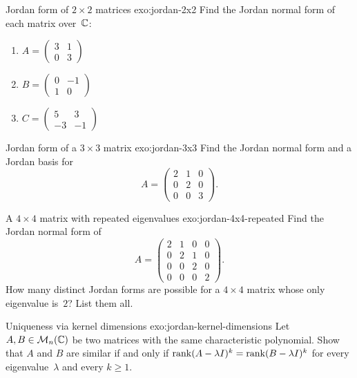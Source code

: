 \begin{exercise}{Jordan form of $2 \times 2$ matrices \basic}%
{exo:jordan-2x2}
Find the Jordan normal form of each matrix over~${\mathbb{C}}$:
\begin{enumerate}[label=(\alph*)]
  \item $A = \begin{pmatrix} 3 & 1 \\ 0 & 3 \end{pmatrix}$
  \item $B = \begin{pmatrix} 0 & -1 \\ 1 & 0 \end{pmatrix}$
  \item $C = \begin{pmatrix} 5 & 3 \\ -3 & -1 \end{pmatrix}$
\end{enumerate}
\end{exercise}

\begin{exercise}{Jordan form of a $3 \times 3$ matrix \intermediate}%
{exo:jordan-3x3}
Find the Jordan normal form and a Jordan basis for
\[
  A = \begin{pmatrix} 2 & 1 & 0 \\ 0 & 2 & 0 \\ 0 & 0 & 3
  \end{pmatrix}.
\]
\end{exercise}

\begin{exercise}{A $4 \times 4$ matrix with repeated eigenvalues
\intermediate}{exo:jordan-4x4-repeated}
Find the Jordan normal form of
\[
  A = \begin{pmatrix}
    2 & 1 & 0 & 0 \\
    0 & 2 & 1 & 0 \\
    0 & 0 & 2 & 0 \\
    0 & 0 & 0 & 2
  \end{pmatrix}.
\]
How many distinct Jordan forms are possible for a $4 \times 4$ matrix
whose only eigenvalue is~$2$?  List them all.
\end{exercise}

\begin{exercise}{Uniqueness via kernel dimensions \intermediate}%
{exo:jordan-kernel-dimensions}
Let $A, B \in \mathcal{M}_n({\mathbb{C}})$ be two matrices with the same characteristic
polynomial.  Show that $A$ and $B$ are similar if and only if
$\operatorname{rank}(A - \lambda I)^k = \operatorname{rank}(B - \lambda I)^k$ for every
eigenvalue~$\lambda$ and every $k \geq 1$.
\end{exercise}

